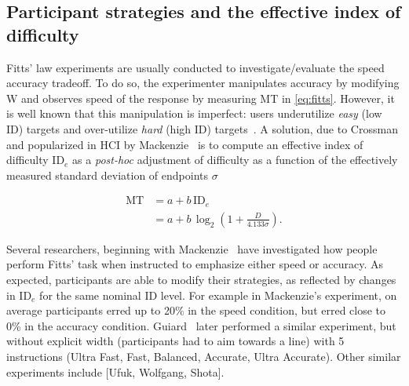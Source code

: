 \documentclass[12pt,a4paper]{article}
\newcommand{\ide}{\ensuremath{{\text{ID}_e}}\xspace}
\begin{document}
\subsection{Participant strategies and the effective index of difficulty}
Fitts' law experiments are usually conducted to investigate/evaluate the speed accuracy tradeoff. To do so, the experimenter manipulates accuracy by modifying W and observes speed of the response by measuring MT in \autoref{eq:fitts}. However, it is well known that this manipulation is imperfect: users underutilize \textit{easy} (low ID) targets and over-utilize \textit{hard} (high ID) targets~\cite{guiard2011,zhai2004nominal}.
A solution, due to Crossman and popularized in HCI by Mackenzie~\cite{gori2018tochi} is to compute an effective index of difficulty \ide  as a \textit{post-hoc} adjustment of difficulty as a function of the effectively measured standard deviation of endpoints $\sigma$

\begin{align}
	\text{MT} & = a + b\,\text{ID}_e                                                   \\
	          & = a + b\,\log_2 \left(1 + \frac{D}{4.133\sigma}\right). \label{eq:ide}
\end{align}

Several researchers, beginning with Mackenzie~\cite{mackenzie2008} have investigated how people perform Fitts' task when instructed to emphasize either speed or accuracy. As expected, participants are able to modify their strategies, as reflected by changes in \ide for the same nominal ID level. For example in Mackenzie's experiment, on average participants erred up to 20\% in the speed condition, but erred close to 0\% in the accuracy condition. Guiard~\cite{guiard2011} later performed a similar experiment, but without explicit width (participants had to aim towards a line) with 5 instructions (Ultra Fast, Fast, Balanced, Accurate, Ultra Accurate). Other similar experiments include [Ufuk, Wolfgang, Shota].
\end{document}
